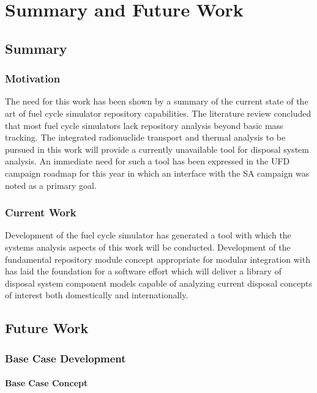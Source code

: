 \chapter{Summary and Future Work}\label{ch:future}

\section{Summary}

\subsection{Motivation}

The need for this work has been shown by a summary of the current state of the 
art of fuel cycle simulator repository capabilities. The literature review 
concluded that most fuel cycle simulators lack repository analysis beyond basic 
mass tracking. The integrated radionuclide transport and thermal analysis to be 
pursued in this work will provide a currently unavailable tool for disposal 
system analysis. An immediate need for such a tool has been expressed in the 
\gls{UFD} campaign roadmap for this year in which an interface with the \gls{SA} 
campaign was noted as a primary goal. 

\subsection{Current Work}

Development of the \Cyclus fuel cycle simulator has generated a tool with which 
the systems analysis aspects of this work will be conducted. Development of the  
fundamental repository module concept appropriate for modular integration with 
\Cyclus has laid the foundation for a software effort which will deliver a 
library of disposal system component models capable of analyzing current 
disposal concepts of interest both domestically and internationally.

\section{Future Work}

\subsection{Base Case Development}


\subsubsection{Base Case Concept}

